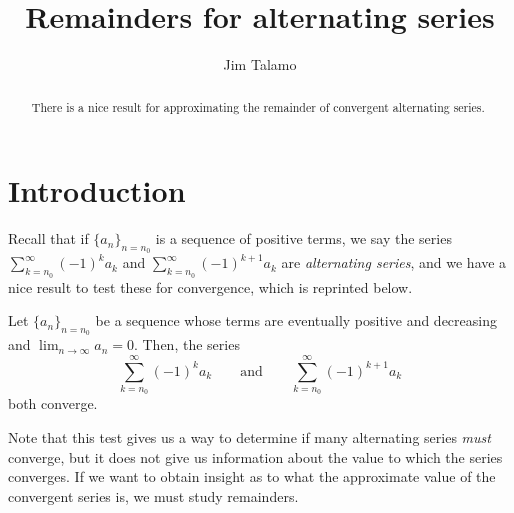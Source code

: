 \documentclass{ximera}
\title[Dig-In:]{Remainders for alternating series}
\author{Jim Talamo}
\begin{document}
\begin{abstract}
There is a nice result for approximating the remainder of convergent alternating series. 
\end{abstract}
\maketitle

\section{Introduction}
Recall that if $\{a_n\}_{n=n_0}$ is a sequence of positive terms, we say the series $\sum_{k=n_0}^{\infty} (-1)^k a_k$ and $\sum_{k=n_0}^{\infty} (-1)^{k+1} a_k$ are \emph{alternating series}, and we have a nice result to test these for convergence, which is reprinted below.

\begin{theorem}
Let $\{a_n\}_{n=n_0}$ be a sequence whose terms are eventually positive and decreasing and
$\lim_{n\to\infty}a_n=0$. Then, the series 
\[
\sum_{k=n_0}^\infty (-1)^{k}a_k \qquad \text{and}\qquad \sum_{k=n_0}^\infty (-1)^{k+1}a_k 
\]
both converge.
\end{theorem}


Note that this test gives us a way to determine if many alternating series \emph{must} converge, but it does not give us information about the value to which the series converges.  If we want to obtain insight as to what the approximate value of the convergent series is, we must study remainders.

  

\begin{image}
\end{image}
\end{document}
